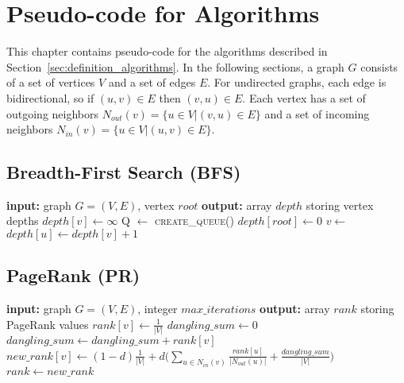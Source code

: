 \chapter{Pseudo-code for Algorithms}
\label{chap:algorithms}
This chapter contains pseudo-code for the algorithms described in Section~\ref{sec:definition_algorithms}. In the following sections, a graph $G$ consists of a set of vertices $V$ and a set of edges $E$. For undirected graphs, each edge is bidirectional, so if $(u, v) \in E$ then $(v, u) \in E$. Each vertex has a set of outgoing neighbors $N_{out}(v) = \{u \in V | (v, u) \in E\}$ and a set of incoming neighbors $N_{in}(v) = \{u \in V | (u, v) \in E\}$.

\section{Breadth-First Search (BFS)}

\begin{algorithm}[h!]
\begin{algorithmic}[1]
\Statex \textbf{input:} graph $G=(V,E)$, vertex $root$
\Statex \textbf{output:} array $depth$ storing vertex depths
  \State $depth[v] \gets \infty$  
\EndFor
\State Q $\gets$  \textsc{create\_queue()}
\State {}
\State $depth[root] \gets 0$
  \State $v \gets $ 
      \State $depth[u] \gets depth[v] + 1$
      \State {}
    \EndIf
  \EndFor
\EndWhile
\end{algorithmic}
\end{algorithm}

\section{PageRank (PR)}

\begin{algorithm}[h!]
\begin{algorithmic}[1]
\Statex \textbf{input:} graph $G=(V,E)$, integer $max\_iterations$
\Statex \textbf{output:} array $rank$ storing PageRank values
  \State $rank[v] \gets \frac{1}{|V|}$  
\EndFor
{}
\State $dangling\_sum \gets 0$
    \State $dangling\_sum \gets dangling\_sum + rank[v]$
  \EndIf
\EndFor
{}
  \State $new\_rank[v] \gets (1-d)\frac{1}{|V|} + d \Big( \sum_{u \in N_{in}(v)} \frac{rank[u]}{|N_{out}(u)|} +  \frac{dangling\_sum}{|V|} \Big)$
\EndFor
\State $rank \gets new\_rank$
\EndFor
\end{algorithmic}
\end{algorithm}

